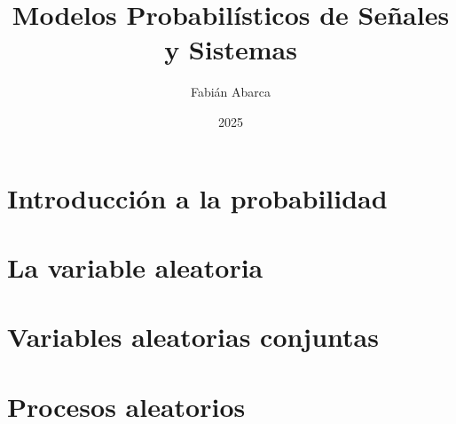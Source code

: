 \documentclass{memoir}
\title{Modelos Probabilísticos de Señales y Sistemas}
\author{Fabián Abarca}
\date{2025}
\begin{document}
\maketitle
\newpage
\tableofcontents

\part{Introducción a la probabilidad}






\part{La variable aleatoria}


\part{Variables aleatorias conjuntas}


\part{Procesos aleatorios}

\end{document}
